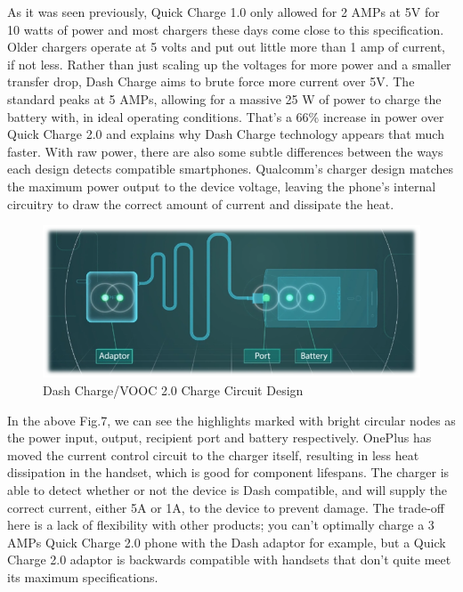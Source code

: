 \documentclass[conference]{IEEEtran}
\begin{document}
As it was seen previously, Quick Charge 1.0 only allowed for 2 AMPs at 5V for 10 watts of power and most chargers these days come close to this specification. Older chargers operate at 5 volts and put out little more than 1 amp of current, if not less. Rather than just scaling up the voltages for more power and a smaller transfer drop, Dash Charge aims to brute force more current over 5V. The standard peaks at 5 AMPs, allowing for a massive 25 W of power to charge the battery with, in ideal operating conditions. That’s a 66\% increase in power over Quick Charge 2.0 and explains why Dash Charge technology appears that much faster. With raw power, there are also some subtle differences between the ways each design detects compatible smartphones. Qualcomm’s charger design matches the maximum power output to the device voltage, leaving the phone's internal circuitry to draw the correct amount of current and dissipate the heat. 

\begin{figure}[h!]
  \includegraphics[width=\linewidth]{images/image7.png}
  \caption{Dash Charge/VOOC 2.0 Charge Circuit Design\cite{b15}}
\end{figure}



In the above Fig.7, we can see the highlights marked with bright circular nodes as the power input, output, recipient port and battery respectively. OnePlus has moved the current control circuit to the charger itself, resulting in less heat dissipation in the handset, which is good for component lifespans. The charger is able to detect whether or not the device is Dash compatible, and will supply the correct current, either 5A or 1A, to the device to prevent damage. The trade-off here is a lack of flexibility with other products; you can’t optimally charge a 3 AMPs Quick Charge 2.0 phone with the Dash adaptor for example, but a Quick Charge 2.0 adaptor is backwards compatible with handsets that don’t quite meet its maximum specifications\cite{b15}.
\end{document}
